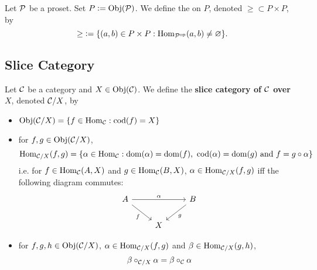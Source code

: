 \documentclass{book}
\begin{document}
	\begin{defn}
		Let $\mathcal{P}$ be a proset. Set $P \vcentcolon= \operatorname{Obj}(\mathcal{P})$. We define the  on $P$, denoted ${\geq} \subset P \times P$, by 
		$${\geq} \vcentcolon= \{(a,b) \in P \times P: \operatorname{Hom}_{\mathcal{\mathcal{P}}^{\text{op}}}(a,b) \neq \varnothing\}.$$
	\end{defn}





































	
	
	
	\subsection{Slice Category}
	
	\begin{defn} \ld{12006}
		Let $\mathcal{C}$ be a category and $X \in \operatorname{Obj}(\mathcal{C})$. We define the \textbf{slice category of $\mathcal{C}$ over $X$}, denoted $\mathcal{C} / X$, by
		\begin{itemize}
			\item $\operatorname{Obj}(\mathcal{C} / X) = \{f \in \operatorname{Hom}_{\mathcal{C}}: \operatorname{cod}(f) = X\}$
			\item for $f,g \in \operatorname{Obj}(\mathcal{C} / X)$, 
			$$\operatorname{Hom}_{\mathcal{C} / X}(f, g) = \{\alpha \in \operatorname{Hom}_{\mathcal{C}} : \operatorname{dom}(\alpha) = \operatorname{dom}(f) \text{, } \operatorname{cod}(\alpha) = \operatorname{dom}(g) \text{ and } f = g \circ \alpha \}$$
			i.e. for $f \in \operatorname{Hom}_{\mathcal{C}}(A, X)$ and $g \in \operatorname{Hom}_{\mathcal{C}}(B, X)$, $\alpha \in \operatorname{Hom}_{\mathcal{C} / X}(f, g)$ iff the following diagram commutes: 
			\[ 
			\begin{tikzcd}
				A \arrow[rr, "\al"] \arrow[dr, "f"'] 	
				& & B  \arrow[dl, "g"] \\
				& X 
			\end{tikzcd}
			\]
			\item for $f,g, h \in \operatorname{Obj}(\mathcal{C} / X)$, $\alpha \in \operatorname{Hom}_{\mathcal{C} / X}(f, g)$ and $\beta \in \operatorname{Hom}_{\mathcal{C} / X}(g, h)$, 
			$$\beta \circ_{\mathcal{C} / X} \alpha = \beta \circ_{\mathcal{C}} \alpha$$
		\end{itemize}
	\end{defn}
	
\end{document}
